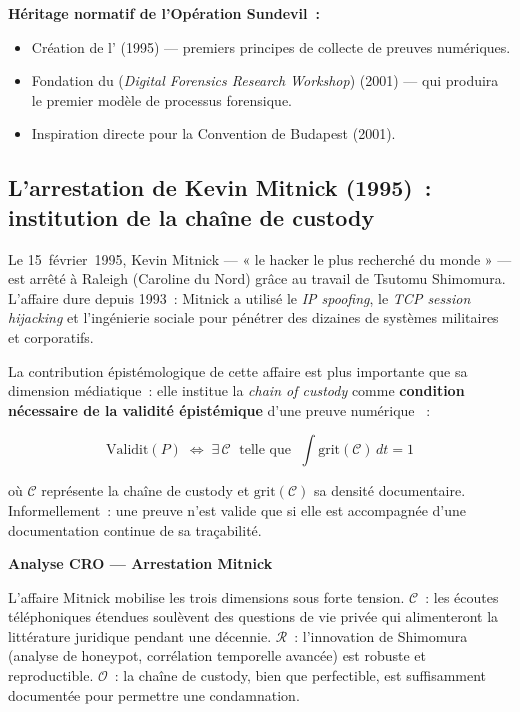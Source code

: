 \begin{boxjuris}
\textbf{Héritage normatif de l'Opération Sundevil~:}
\begin{itemize}
    \item Création de l' (1995) --- premiers principes de collecte
          de preuves numériques.
    \item Fondation du  (\textit{Digital Forensics Research
          Workshop}) (2001) --- qui produira le premier modèle de processus
          forensique.
    \item Inspiration directe pour la Convention de Budapest (2001).
\end{itemize}
\end{boxjuris}

\subsection{L'arrestation de Kevin Mitnick (1995)~: institution de la chaîne de custody}

Le 15~février~1995, Kevin Mitnick --- « le hacker le plus recherché du monde »
--- est arrêté à Raleigh (Caroline du Nord) grâce au travail de Tsutomu
Shimomura. L'affaire dure depuis 1993~: Mitnick a utilisé le \textit{IP
spoofing}, le \textit{TCP session hijacking} et l'ingénierie sociale pour
pénétrer des dizaines de systèmes militaires et corporatifs.

\medskip

La contribution épistémologique de cette affaire est plus importante que
sa dimension médiatique~: elle institue la \textit{chain of custody}
comme \textbf{condition nécessaire de la validité épistémique} d'une
preuve numérique \cite{chap2pdf}~:

\begin{equation}
\mathrm{Validit}(P) \;\Leftrightarrow\;
\exists\, \mathcal{C} \;\text{ telle que }\; \int \mathrm{grit}(\mathcal{C})\,dt = 1
\label{eq:validite-custody}
\end{equation}

où $\mathcal{C}$ représente la chaîne de custody et $\mathrm{grit}(\mathcal{C})$
sa densité documentaire. Informellement~: une preuve n'est valide que si elle
est accompagnée d'une documentation continue de sa traçabilité.

\begin{boxCRO}
\textbf{Analyse CRO --- Arrestation Mitnick}

L'affaire Mitnick mobilise les trois dimensions sous forte tension.
$\mathcal{C}$~: les écoutes téléphoniques étendues soulèvent des questions
de vie privée qui alimenteront la littérature juridique pendant une décennie.
$\mathcal{R}$~: l'innovation de Shimomura (analyse de honeypot, corrélation
temporelle avancée) est robuste et reproductible. $\mathcal{O}$~: la chaîne
de custody, bien que perfectible, est suffisamment documentée pour permettre
une condamnation.
\end{boxCRO}

